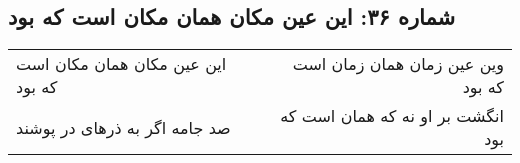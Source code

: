 \begin{center}
\section*{شماره ۳۶: این عین مکان همان مکان است که بود}
\label{sec:036}
\begin{longtable}{l p{0.5cm} r}
این عین مکان همان مکان است که بود
&&
وین عین زمان همان زمان است که بود
\\
صد جامه اگر به ذرهای در پوشند
&&
انگشت بر او نه که همان است که بود
\\
\end{longtable}
\end{center}
